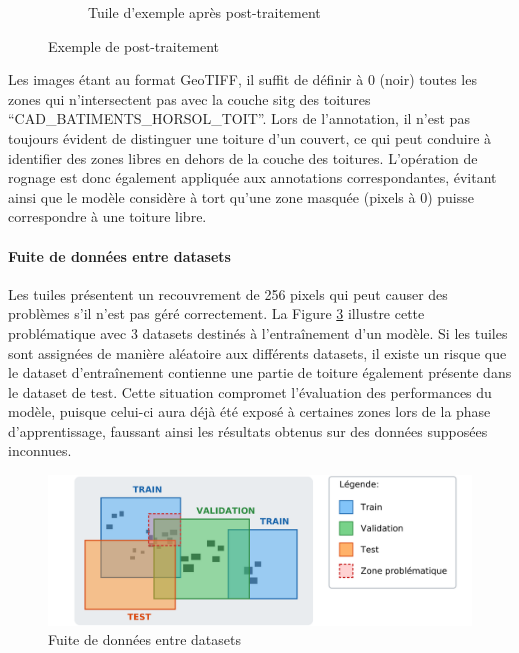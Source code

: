 \begin{figure}[H]
\begin{subfigure}[b]{0.49\textwidth}
        \caption{Tuile d'exemple après post-traitement}
        \label{fig:ch3_postprocessing_dataset_02_exemple_postraitement}
    \end{subfigure}
    \caption{Exemple de post-traitement}
    \label{fig:exemple_post_traitement_dataset}
\end{figure}

Les images étant au format GeoTIFF, il suffit de définir à 0 (noir) toutes les zones qui n'intersectent pas avec la couche \acrshort{sitg} des toitures ``CAD\_BATIMENTS\_HORSOL\_TOIT''. Lors de l'annotation, il n'est pas toujours évident de distinguer une toiture d'un couvert, ce qui peut conduire à identifier des zones libres en dehors de la couche des toitures. L'opération de rognage est donc également appliquée aux annotations correspondantes, évitant ainsi que le modèle considère à tort qu'une zone masquée (pixels à 0) puisse correspondre à une toiture libre.

\paragraph{Fuite de données entre datasets}
Les tuiles présentent un recouvrement de 256 pixels qui peut causer des problèmes s'il n'est pas géré correctement. La Figure \ref{fig:ch3_postprocessing_dataset_04_data_leakage} illustre cette problématique avec 3 datasets destinés à l'entraînement d'un modèle. Si les tuiles sont assignées de manière aléatoire aux différents datasets, il existe un risque que le dataset d'entraînement contienne une partie de toiture également présente dans le dataset de test. Cette situation compromet l'évaluation des performances du modèle, puisque celui-ci aura déjà été exposé à certaines zones lors de la phase d'apprentissage, faussant ainsi les résultats obtenus sur des données supposées inconnues.

\begin{figure}[H]
    \centering
    \includegraphics[width=1\linewidth]{02-main/figures/ch3/ch3_postprocessing_dataset_04_data_leakage.png}
    \caption{Fuite de données entre datasets}
    \label{fig:ch3_postprocessing_dataset_04_data_leakage}
\end{figure}

